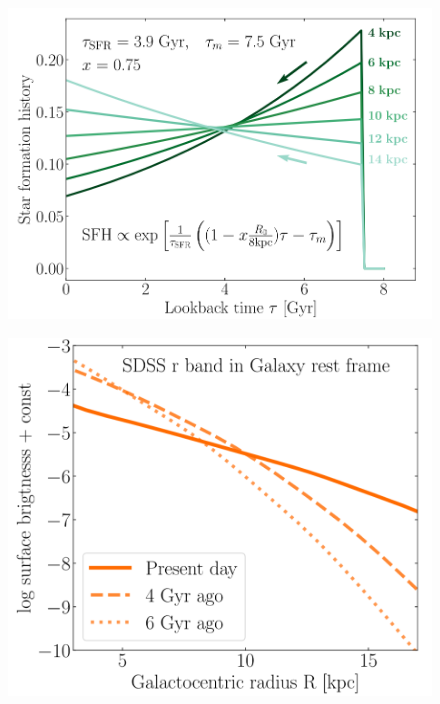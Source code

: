 \documentclass[preprint2]{aastex631}
\begin{document}
\begin{figure}[htb]
    \centering
    \includegraphics[width=\columnwidth]{frankel2019_fig5.png}
    \caption{}
\end{figure}

\begin{figure}[htb]
    \centering
    \includegraphics[width=\columnwidth]{frankel2019_fig9.png}
    \caption{}
\end{figure}
\end{document}
